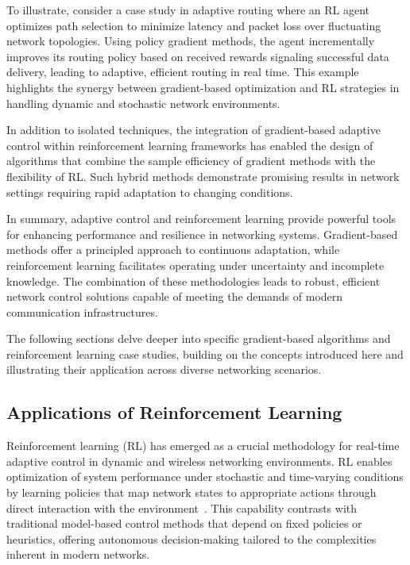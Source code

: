 \documentclass[sigconf]{acmart}
\begin{document}
To illustrate, consider a case study in adaptive routing where an RL agent optimizes path selection to minimize latency and packet loss over fluctuating network topologies. Using policy gradient methods, the agent incrementally improves its routing policy based on received rewards signaling successful data delivery, leading to adaptive, efficient routing in real time. This example highlights the synergy between gradient-based optimization and RL strategies in handling dynamic and stochastic network environments.

In addition to isolated techniques, the integration of gradient-based adaptive control within reinforcement learning frameworks has enabled the design of algorithms that combine the sample efficiency of gradient methods with the flexibility of RL. Such hybrid methods demonstrate promising results in network settings requiring rapid adaptation to changing conditions.

In summary, adaptive control and reinforcement learning provide powerful tools for enhancing performance and resilience in networking systems. Gradient-based methods offer a principled approach to continuous adaptation, while reinforcement learning facilitates operating under uncertainty and incomplete knowledge. The combination of these methodologies leads to robust, efficient network control solutions capable of meeting the demands of modern communication infrastructures.

The following sections delve deeper into specific gradient-based algorithms and reinforcement learning case studies, building on the concepts introduced here and illustrating their application across diverse networking scenarios.


\subsection{Applications of Reinforcement Learning}

Reinforcement learning (RL) has emerged as a crucial methodology for real-time adaptive control in dynamic and wireless networking environments. RL enables optimization of system performance under stochastic and time-varying conditions by learning policies that map network states to appropriate actions through direct interaction with the environment~\cite{ref2,ref5,ref7,ref12,ref31,ref32,ref33,ref34,ref35,ref50}. This capability contrasts with traditional model-based control methods that depend on fixed policies or heuristics, offering autonomous decision-making tailored to the complexities inherent in modern networks.
\end{document}
